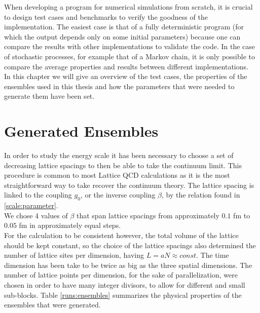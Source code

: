 When developing a program for numerical simulations from scratch, it is crucial to design test cases and benchmarks to verify the goodness of the implementation. The easiest case is that of a fully deterministic program (for which the output depends only on some initial parameters) because one can compare the results with other implementations to validate the code. In the case of stochastic processes, for example that of a Markov chain, it is only possible to compare the average properties and results between different implementations. \\
In this chapter we will give an overview of the test cases, the properties of the ensembles used in this thesis and how the parameters that were needed to generate them have been set.

\section{Generated Ensembles}
In order to study the energy scale it has been necessary to choose a set of decreasing lattice spacings to then be able to take the continuum limit. This procedure is common to most Lattice QCD calculations as it is the most straightforward way to take recover the continuum theory. The lattice spacing is linked to the coupling $g_0$, or the inverse coupling $\beta$, by the relation found in \cref{scale:parameter}.\\ 
We chose 4 values of $\beta$ that span lattice spacings from approximately $0.1$ fm to $0.05$ fm in approximately equal steps. \\
For the calculation to be consistent however, the total volume of the lattice should be kept constant, so the choice of the lattice spacings also determined the number of lattice sites per dimension, having $L = aN\approx const$. The time dimension has been take to be twice as big as the three spatial dimensions. The number of lattice points per dimension, for the sake of parallelization, were chosen in order to have many integer divisors, to allow for different and small sub-blocks. Table \cref{runs:ensembles} summarizes the physical properties of the ensembles that were generated.

